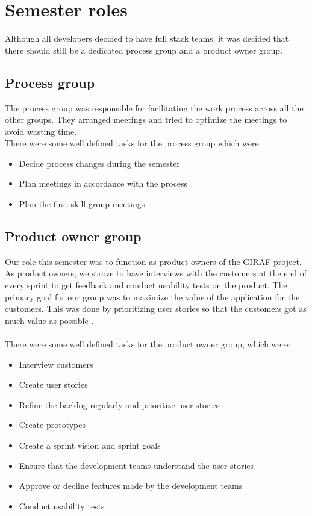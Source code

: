 \section{Semester roles}\label{sec:semesterRoles}
Although all developers decided to have full stack teams, it was decided that there should still be a dedicated process group and a product owner group. 

\subsection{Process group}
The process group was responsible for facilitating the work process across all the other groups.
They arranged meetings and tried to optimize the meetings to avoid wasting time.
\\
There were some well defined tasks for the process group which were:
\begin{itemize}
    \item Decide process changes during the semester
    \item Plan meetings in accordance with the process
    \item Plan the first skill group meetings
\end{itemize}

\subsection{Product owner group}
Our role this semester was to function as product owners of the GIRAF project. 
As product owners, we strove to have interviews with the customers at the end of every sprint to get feedback and conduct usability tests on the product.
The primary goal for our group was to maximize the value of the application for the customers. 
This was done by prioritizing user stories so that the customers got as much value as possible \autocite{TheScrumGuide}.\\
\\
There were some well defined tasks for the product owner group, which were:
\begin{itemize}
    \item Interview customers
    \item Create user stories    
    \item Refine the backlog regularly and prioritize user stories
    \item Create prototypes
    \item Create a sprint vision and sprint goals
    \item Ensure that the development teams understand the user stories
    \item Approve or decline features made by the development teams
    \item Conduct usability tests
\end{itemize}
